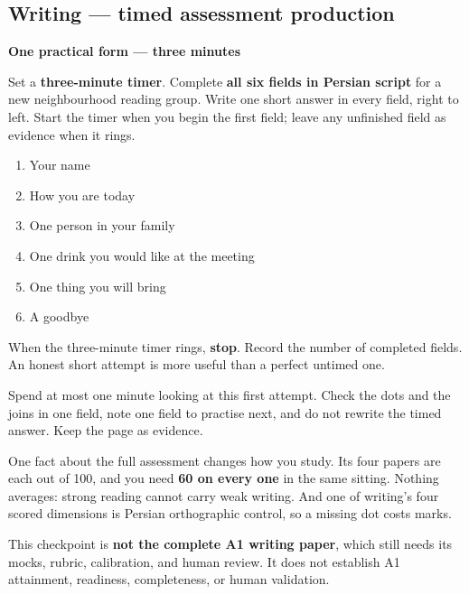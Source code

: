 \subsection*{Writing — timed assessment production}
\textbf{One practical form — three minutes}

Set a \textbf{three-minute timer}. Complete \textbf{all six fields in Persian script} for a new neighbourhood reading group. Write one short answer in every field, right to left. Start the timer when you begin the first field; leave any unfinished field as evidence when it rings.

\begin{enumerate}
\raggedright
  \item Your name
  \item How you are today
  \item One person in your family
  \item One drink you would like at the meeting
  \item One thing you will bring
  \item A goodbye
\end{enumerate}

When the three-minute timer rings, \textbf{stop}. Record the number of completed fields. An honest short attempt is more useful than a perfect untimed one.

\begin{tcolorbox}[breakable,colback=teal!4,colframe=teal!35!black,title={Before you move on}]
Spend at most one minute looking at this first attempt. Check the dots and the joins in one field, note one field to practise next, and do not rewrite the timed answer. Keep the page as evidence.

One fact about the full assessment changes how you study. Its four papers are each out of 100, and you need \textbf{60 on every one} in the same sitting. Nothing averages: strong reading cannot carry weak writing. And one of writing's four scored dimensions is Persian orthographic control, so a missing dot costs marks.

This checkpoint is \textbf{not the complete A1 writing paper}, which still needs its mocks, rubric, calibration, and human review. It does not establish A1 attainment, readiness, completeness, or human validation.
\end{tcolorbox}
